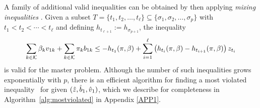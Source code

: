 \documentclass[msom]{oo}
\begin{document}
\begin{comment} 
Given the coefficients $(\pisol,\betasol)$ we obtain a lower bound $h_{\m'}(\pisol,\betasol) \leq V_{\m'}(\vsol_1,\bsol_1)$ on the optimal value of the following subproblem for each scenario $\m' \in \EM$:
\begin{alignat}{2}
V_{\m'}(\vsol_1,\bsol_1) := \min_{\Vi_1,\Bi_1,\Es_1,\Sc^{\m'}} \ & \sum_{\ka  \in \KA} \betasol_\ka \Vi_{1 \ka} - \sum_{\ka  \in \KA} \pisol_k \Bi_{1  \ka} \notag\\
\text{s.t. } &  \sum_{\jey \in  \Psub} \Sc^{\m'}_{\jey \ka } = D_{2\ka}^{\m'} + \Bi_{1  \ka} \ &&\qquad \forall \ka  \in \KA \notag \\
    &\sum_{\jey \in  \Csub} \Sc^{\m'}_{\ka \jey } \leq \Vi_{1 \ka} \ && \qquad\forall \ka  \in \KA \notag \\
    & \sum_{\jey \in  \Psub} \Es_{1 \jey \ka} + \Bi_{1  \ka}  = D_{1 \ka} + \hat{\Bi}_{0 \ka} \quad && \qquad\forall \ka  \in \KA \notag\\
    & \sum_{\jey \in  \Csub} \Es_{1 \ka \jey} \leq \hat{\Vi}_{0 \ka}  && \qquad\forall \ka  \in \KA \notag\\
    & \Vi_1 , \Bi_1, \ \Es_1, \Sc^{\m'}  \geq \mathbf{0}.  \notag
\end{alignat}
In this problem we consider substitution variables both for the period $1$ and for scenario $\m'$ in period 2. The substitution variables for period 1 are to enforce that $\Bi_1$ satisfies the initial period constraints. The substitution variables for the scenario $\m'$ are to enforce that $(\Vi_1,\Bi_1) \in Q({D^{\m'}_2})$. 
 Thus, by construction, the value $V_{\m'}(\vsol_1,\bsol_1)$ (and hence any lower bound $h_{\m'}(\pisol,\betasol)$) provides a lower bound on the value that the expression 
\[ \sum_{\ka  \in \KA} \betasol_{\ka} \Vi_{1\ka} - \sum_{\ka  \in \KA} \pisol_k \Bi_{1\ka} \]
can take when $\Zed_{\m'}=0$.

\end{comment}




A family of additional valid inequalities can be obtained by then applying {\it mixing inequalities} \citep{gunluk2001mixing,luedtke2014branch}. Given a subset $T = \{t_1,t_2,\ldots,t_{\ell}\} \subseteq \{\sigma_1,\sigma_2,\ldots,\sigma_p\}$ with $t_1 < t_2 < \cdots < t_{\ell}$ and defining $h_{t_{\ell+1}}:= h_{\sigma_{p+1}}$, the inequality
\begin{equation}
\label{eq:mixed}
  \sum_{k  \in \mathcal{K}} \beta_k v_{1k} + \sum_{k  \in \mathcal{K}} \pi_k b_{1k} \leq 
  - h_{t_1}(\pi,\beta) + \sum_{i=1}^{\ell} \left(h_{t_i}(\pi,\beta) - h_{t_{i+1}}(\pi,\beta)\right)z_{t_i}
\end{equation}
is valid for the master problem. Although the number of such inequalities grows exponentially with $p$, there is an efficient algorithm for finding a most violated inequality~\citep{gunluk2001mixing} for given $(\hat{z},\hat{b}_1,\hat{v}_1)$, which we describe for completeness in Algorithm~\ref{alg:mostviolated} in Appendix \ref{APP1}. 
\end{document}
